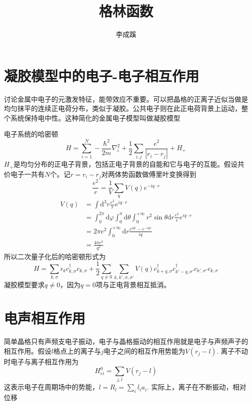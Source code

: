 \documentclass[a4paper,14pt]{article}
\begin{document}
    \title{格林函数}
    \author{李成蹊}
    \maketitle
    \section{凝胶模型中的电子-电子相互作用}
    讨论金属中电子的元激发特征，能带效应不重要。可以把晶格的正离子近似当做是均匀抹平的连续正电荷分布，类似于凝胶。公共电子则在此正电荷背景上运动，整个系统保持电中性。这种简化的金属电子模型叫做凝胶模型

    电子系统的哈密顿
    \begin{equation*}
        H=\sum_{i=1}^{N}-\frac{\hbar^2}{2m}\nabla_i^2+\frac{1}{2}\sum_{i,j}\frac{e^2}{|r_i-r_j|}+H_+
    \end{equation*}
    $H_+$是均匀分布的正电子背景，包括正电子背景的自能和它与电子的互能。假设共价电子一共有$N$个。记$r=r_i-r_j$对两体势函数做傅里叶变换得到
    \begin{equation*}
        \frac{e^2}{r}=\frac{1}{V}\sum_qV(q)e^{-iq\cdot r}
    \end{equation*}
    \begin{equation*}
        \begin{split}
            V(q)&=\int \mathrm{d}^3r\frac{e^2}{r}e^{iq\cdot r}\\
            &=\int_{0}^{2\pi}\mathrm{d}\varphi\int_{0}^{\pi}\mathrm{d}\theta\int_{0}^{+\infty}r^2\sin\theta\mathrm{d}r\frac{e^2}{r}e^{iq\cdot r}\\
            &=2\pi e^2\int_{0}^{+\infty}\mathrm{d}r\frac{e^{iqr}-e^{-iqr}}{iq}\\
            &=\frac{4\pi e^2}{q^2}
        \end{split}
    \end{equation*}
    所以二次量子化后的哈密顿形式为
    \begin{equation*}
        H=\sum_{k,\sigma}\epsilon_kc_{k,\sigma}^\dagger c_{k,\sigma}+\frac{1}{2}\sum_{q\neq 0}\sum_{k,k',\sigma,\sigma'}V(q)c_{k+q,\sigma}^\dagger c_{k'-q,\sigma'}^\dagger c_{k',\sigma'}c_{k,\sigma}
    \end{equation*}
    凝胶模型要求$q\neq0$，因为$q=0$项与正电背景相互抵消。
    \section{电声相互作用}
    简单晶格只有声频支电子振动，电子与晶格振动的相互作用就是电子与声频声子的相互作用。假设$l$格点上的离子与$j$电子之间的相互作用势能为$V(r_j-l)$. 离子不动时电子与离子相互作用为
    \begin{equation*}
        H^0_{ei}=\sum_{j,l}V(r_j-l)
    \end{equation*}
    这表示电子在周期场中的势能，$l=R_l=\sum_{i}l_ia_i$. 实际上，离子在不断振动，相对位移
\end{document}
